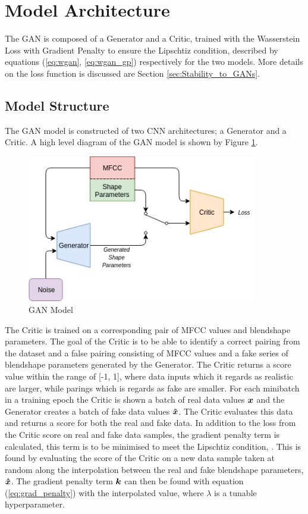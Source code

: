 \section{Model Architecture}
The GAN is composed of a Generator and a Critic, trained with the Wasserstein Loss with Gradient Penalty to ensure the Lipschtiz condition, described by equations (\ref{eq:wgan}, \ref{eq:wgan_gp}) respectively for the two models.
More details on the loss function is discussed are Section \ref{sec:Stability_to_GANs}.

\subsection{Model Structure}
The GAN model is constructed of two CNN architectures; a Generator and a Critic.
A high level diagram of the GAN model is shown by Figure \ref{fig:gan_model}.

\begin{figure}[h!]
    \centering
        \includegraphics[width=0.9\textwidth]{figures/gan/gan.png}
    \caption{GAN Model}\label{fig:gan_model}
\end{figure} 

The Critic is trained on a corresponding pair of MFCC values and blendshape parameters.
The goal of the Critic is to be able to identify a correct pairing from the dataset and a false pairing consisting of MFCC values and a fake series of blendshape parameters generated by the Generator.
The Critic returns a score value within the range of [-1, 1], where data inputs which it regards as realistic are larger, while parings which is regards as fake are smaller.
For each minibatch in a training epoch the Critic is shown a batch of real data values ${\boldsymbol{{x}}}$ and the Generator creates a batch of fake data values ${\boldsymbol{{\tilde{x}}}}$.
The Critic evaluates this data and returns a score for both the real and fake data.
In addition to the loss from the Critic score on real and fake data samples, the gradient penalty term is calculated, this term is to be minimised to meet the Lipschtiz condition, \cite{Gulrajani2017}.
This is found by evaluating the score of the Critic on a new data sample taken at random along the interpolation between the real and fake blendshape parameters, ${\boldsymbol{{\hat{x}}}}$.
The gradient penalty term ${\boldsymbol{{k}}}$ can then be found with equation (\ref{eq:grad_penalty}) with the interpolated value, where $\lambda$ is a tunable hyperparameter.

